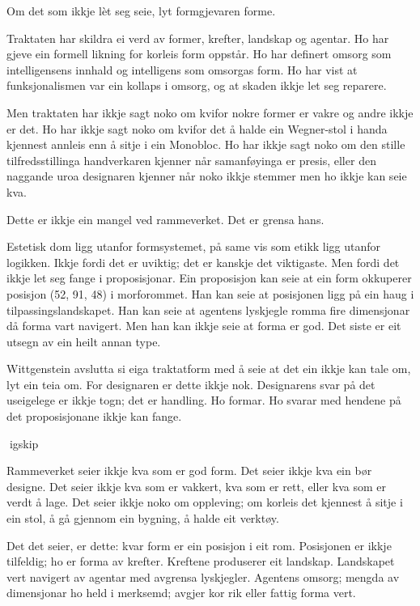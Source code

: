 
Om det som ikkje lèt seg seie, lyt formgjevaren forme.

Traktaten har skildra ei verd av former, krefter, landskap og agentar. Ho har gjeve ein formell likning for korleis form oppstår. Ho har definert omsorg som intelligensens innhald og intelligens som omsorgas form. Ho har vist at funksjonalismen var ein kollaps i omsorg, og at skaden ikkje let seg reparere.

Men traktaten har ikkje sagt noko om kvifor nokre former er vakre og andre ikkje er det. Ho har ikkje sagt noko om kvifor det å halde ein Wegner-stol i handa kjennest annleis enn å sitje i ein Monobloc. Ho har ikkje sagt noko om den stille tilfredsstillinga handverkaren kjenner når samanføyinga er presis, eller den naggande uroa designaren kjenner når noko ikkje stemmer men ho ikkje kan seie kva.

Dette er ikkje ein mangel ved rammeverket. Det er grensa hans.

Estetisk dom ligg utanfor formsystemet, på same vis som etikk ligg utanfor logikken. Ikkje fordi det er uviktig; det er kanskje det viktigaste. Men fordi det ikkje let seg fange i proposisjonar. Ein proposisjon kan seie at ein form okkuperer posisjon (52, 91, 48) i morforommet. Han kan seie at posisjonen ligg på ein haug i tilpassingslandskapet. Han kan seie at agentens lyskjegle romma fire dimensjonar då forma vart navigert. Men han kan ikkje seie at forma er god. Det siste er eit utsegn av ein heilt annan type.

Wittgenstein avslutta si eiga traktatform med å seie at det ein ikkje kan tale om, lyt ein teia om. For designaren er dette ikkje nok. Designarens svar på det useigelege er ikkje togn; det er handling. Ho formar. Ho svarar med hendene på det proposisjonane ikkje kan fange.

igskip

Rammeverket seier ikkje kva som er god form. Det seier ikkje kva ein bør designe. Det seier ikkje kva som er vakkert, kva som er rett, eller kva som er verdt å lage. Det seier ikkje noko om oppleving; om korleis det kjennest å sitje i ein stol, å gå gjennom ein bygning, å halde eit verktøy.

Det det seier, er dette: kvar form er ein posisjon i eit rom. Posisjonen er ikkje tilfeldig; ho er forma av krefter. Kreftene produserer eit landskap. Landskapet vert navigert av agentar med avgrensa lyskjegler. Agentens omsorg; mengda av dimensjonar ho held i merksemd; avgjer kor rik eller fattig forma vert.

